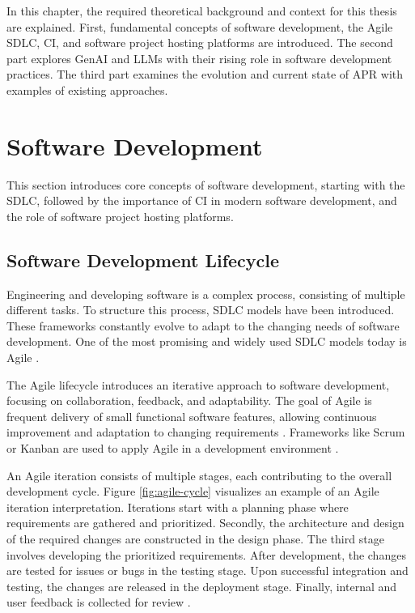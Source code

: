 In this chapter, the required theoretical background and context for this thesis are explained. First, fundamental concepts of software development, the Agile \ac{SDLC}, \acf{CI}, and software project hosting platforms are introduced. The second part explores \ac{GenAI} and \acp{LLM} with their rising role in software development practices. The third part examines the evolution and current state of \ac{APR} with examples of existing approaches.

\section{Software Development}

This section introduces core concepts of software development, starting with the \ac{SDLC}, followed by the importance of \ac{CI} in modern software development, and the role of software project hosting platforms.

\subsection{Software Development Lifecycle}

Engineering and developing software is a complex process, consisting of multiple different tasks. To structure this process, \ac{SDLC} models have been introduced. These frameworks constantly evolve to adapt to the changing needs of software development. One of the most promising and widely used \ac{SDLC} models today is Agile \cite{rupareliaSoftwareDevelopmentLifecycle2010, abrahamssonAgileSoftwareDevelopment2017}.

The Agile lifecycle introduces an iterative approach to software development, focusing on collaboration, feedback, and adaptability. The goal of Agile is frequent delivery of small functional software features, allowing continuous improvement and adaptation to changing requirements \cite{rupareliaSoftwareDevelopmentLifecycle2010, abrahamssonAgileSoftwareDevelopment2017}. Frameworks like Scrum or Kanban are used to apply Agile in a development environment \cite{zayatFrameworkStudyAgile2020}.

An Agile iteration consists of multiple stages, each contributing to the overall development cycle. Figure \ref{fig:agile-cycle} visualizes an example of an Agile iteration interpretation. Iterations start with a planning phase where requirements are gathered and prioritized. Secondly, the architecture and design of the required changes are constructed in the design phase. The third stage involves developing the prioritized requirements. After development, the changes are tested for issues or bugs in the testing stage. Upon successful integration and testing, the changes are released in the deployment stage. Finally, internal and user feedback is collected for review \cite{huoSoftwareQualityAgile2004}.

